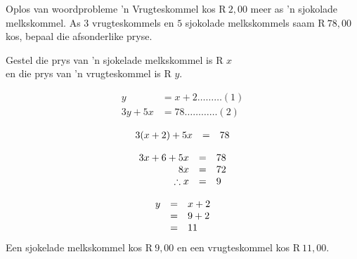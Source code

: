 \begin{wex}
{Oplos van woordprobleme}
{
’n
Vrugteskommel kos R$~2,00$ meer as ’n sjokolade melkskommel. As $3$ vrugteskommels en $5$ sjokolade melkskommels saam  R$~78,00$ kos,
bepaal die afsonderlike pryse.}

{
Gestel die prys van ’n sjokelade melkskommel is R $x$ 
\\en die prys van ’n vrugteskommel is  R $y$.


\begin{align*}
  y &= x+2  \ldots \ldots \ldots (1)\\
  3y+5x &= 78 \ldots \ldots \ldots \ldots (2)
\end{align*}

\begin{equation*}
\begin{array}{ccl}\hfill 3(x+2)+5x& =& 78\hfill \\
\end{array}
\end{equation*}

\begin{equation*}
\begin{array}{ccl}
 \hfill 3x+6+5x& =& 78\hfill \\ 
\hfill 8x& =& 72\hfill \\ 
\hfill \therefore x& =& 9\hfill \\  \end{array}
\end{equation*}

\begin{equation*}
\begin{array}{ccl}
\hfill y& =& x+2\hfill \\
 \hfill & =& 9+2\hfill \\ 
\hfill &  =& 11\hfill  \end{array}
\end{equation*}
Een sjokelade melkskommel kos R$~9,00$ en een vrugteskommel
kos R$~ 11,00$.
}
\end{wex}


